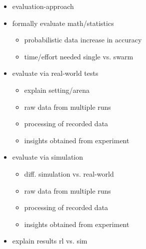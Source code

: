 \begin{itemize}
	\item{evaluation-approach}
	\item{formally evaluate math/statistics}
	\begin{itemize}
		\item{probabilistic data increase in accuracy}
		\item{time/effort needed single vs. swarm}
	\end{itemize}
	\item{evaluate via real-world tests}
	\begin{itemize}
		\item{explain setting/arena}
		\item{raw data from multiple runs}
		\item{processing of recorded data}
		\item{insights obtained from experiment}
	\end{itemize}
	\item{evaluate via simulation}
	\begin{itemize}
		\item{diff. simulation vs. real-world}
		\item{raw data from multiple runs}
		\item{processing of recorded data}
		\item{insights obtained from experiment}
	\end{itemize}
	\item{explain results rl vs. sim}
\end{itemize}